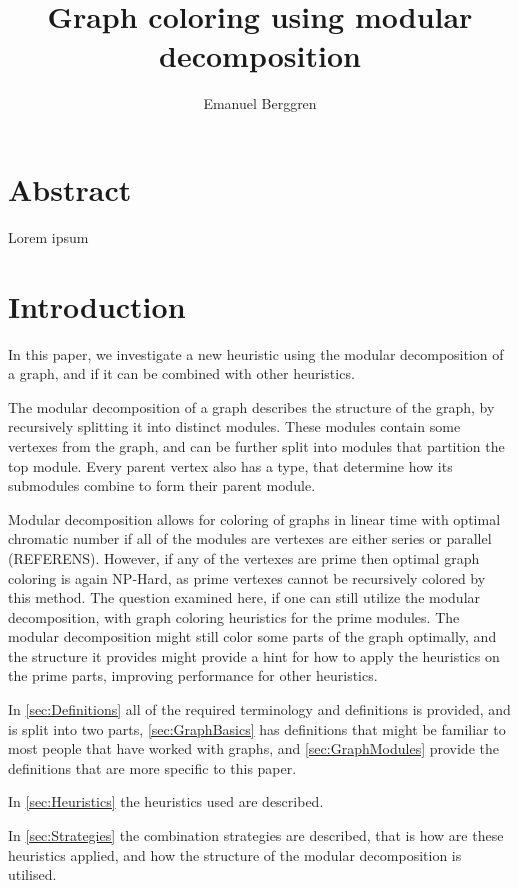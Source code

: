 \documentclass{amsart}
\author{Emanuel Berggren}
\title{Graph coloring using modular decomposition}
\begin{document}
\maketitle

\section{Abstract}

Lorem ipsum

\section{Introduction}

In this paper, we investigate a new heuristic using the modular decomposition of
a graph, and if it can be combined with other heuristics. 

The modular decomposition of a graph describes the structure of the graph, by
recursively splitting it into distinct modules. These modules contain some
vertexes from the graph, and can be further split into modules that partition
the top module. Every parent vertex also has a type, that determine how its submodules
combine to form their parent module.

Modular decomposition allows for coloring of graphs in linear time with optimal
chromatic number if all of the modules are vertexes are either  series or
parallel (REFERENS). However, if any of the vertexes are prime then optimal graph coloring 
is again NP-Hard, as prime vertexes cannot be recursively colored by this
method. The question examined here, if one can still utilize the
modular decomposition, with graph coloring heuristics for the prime modules.
The modular decomposition might still color some parts of the graph optimally,
and the structure it provides might provide a hint for how to apply the
heuristics on the prime parts, improving performance for other heuristics.

In \autoref{sec:Definitions} all of the required terminology and definitions is
provided, and is split into two parts, \autoref{sec:GraphBasics} has definitions that might be
familiar to most people that have worked with graphs, and
\autoref{sec:GraphModules} provide the definitions that are more specific to
this paper.

In \autoref{sec:Heuristics} the heuristics used are described.

In \autoref{sec:Strategies} the combination strategies are described, that is how are
these heuristics applied, and how the structure of the modular decomposition is
utilised.
\end{document}
